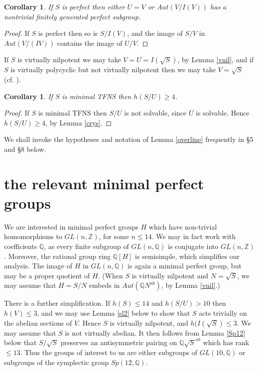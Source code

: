 \documentclass[12pt]{amsart}
\renewcommand{\geq}{\geqslant}
\renewcommand{\leq}{\leqslant}
\newtheorem{cor}[theorem]{Corollary}
\begin{document}
\begin{cor}
If $S$ is perfect then either $U=V$ or $Aut(V/I(V))$ has a nontrivial finitely 
generated perfect subgroup.
\end{cor}

\begin{proof}
If $S$ is perfect then so is $S/I(V)$, 
and the image of $S/V$ in $Aut(V/(IV))$ contains the image of $U/V$.
\end{proof}

If $S$ is virtually nilpotent we may take $V=U=I(\sqrt{S})$,
by Lemma \ref{vnil},
and if $S$ is virtually polycyclic but not virtually nilpotent
then we may take $V=\sqrt{S}$ (cf. \cite[15.1.6]{Ro}).

\begin{cor}
If $S$ is minimal TFNS then $h(S/U)\geq4$. 
\end{cor}

\begin{proof}
If $S$ is minimal TFNS then $S/U$ is not solvable,
since $U$ is solvable.
Hence $h(S/U)\geq4$, by Lemma \ref{crys}.
\end{proof}

We shall invoke the hypotheses and notation of Lemma \ref{overline} frequently
in \S5 and \S8 below.

\section{the relevant minimal perfect groups}

We are interested in minimal perfect groups $H$ which have non-trivial 
homomorphisms to $GL(n,\mathbb{Z})$, for some $n\leq14$. 
We may in fact work with coefficients $\mathbb{Q}$,
as every finite subgroup of $GL(n,\mathbb{Q})$ is conjugate into 
$GL(n,\mathbb{Z})$. 
Moreover,  the rational group ring $\mathbb{Q}[H]$ is semisimple,
which simplifies our analysis.
The image of $H$ in $GL(n,\mathbb{Q})$ is again a minimal perfect group, 
but may be a proper quotient of $H$.
(When $S$ is virtually nilpotent and $N=\sqrt{S}$,
we may assume that $H=S/N$ embeds in $Aut(\mathbb{Q}N^{ab})$,
by Lemma \ref{vnil}.)

There is a further simplification.
If $h(S)\leq14$ and $h(S/U)>10$ then $h(V)\leq3$,
and we may use Lemma \ref{sl2} below to show that $S$ acts trivially on 
the abelian sections of $V$.
Hence $S$ is virtually nilpotent, and $h(I(\sqrt{S})\leq3$.
We may assume that $S$ is not virtually abelian.
It then follows from Lemma \ref{Sp12} below that $S/\sqrt{S}$ 
preserves an antisymmetric pairing on $\mathbb{Q}\sqrt{S}^{ab}$
which has rank $\leq13$.
Thus the groups of interest to us are either subgroups of $GL(10,\mathbb{Q})$
or subgroups of the symplectic group $Sp(12,\mathbb{Q})$.
\end{document}
